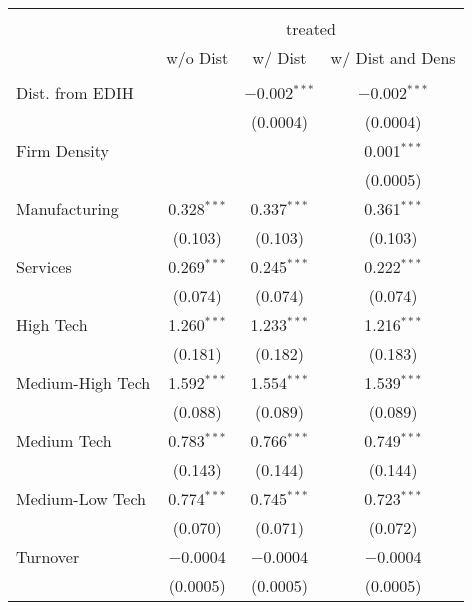 
\begin{table}[!htbp] \centering
\tiny
\renewcommand{\arraystretch}{1} 
  \label{} 
\begin{tabular}{@{\extracolsep{5pt}}lccc} 
\\[-1.8ex]\hline 
\hline 
\\[-1.8ex] & \multicolumn{3}{c}{treated} \\ 
 & w/o Dist & w/ Dist & w/ Dist and Dens \\ 
\hline \\[-1.8ex] 
 Dist. from EDIH &  & $-$0.002$^{***}$ & $-$0.002$^{***}$ \\ 
  &  & (0.0004) & (0.0004) \\ 
  
 Firm Density &  &  & 0.001$^{***}$ \\ 
  &  &  & (0.0005) \\ 
   
 Manufacturing & 0.328$^{***}$ & 0.337$^{***}$ & 0.361$^{***}$ \\ 
  & (0.103) & (0.103) & (0.103) \\ 
   
 Services & 0.269$^{***}$ & 0.245$^{***}$ & 0.222$^{***}$ \\ 
  & (0.074) & (0.074) & (0.074) \\ 
   
 High Tech & 1.260$^{***}$ & 1.233$^{***}$ & 1.216$^{***}$ \\ 
  & (0.181) & (0.182) & (0.183) \\ 

 Medium-High Tech & 1.592$^{***}$ & 1.554$^{***}$ & 1.539$^{***}$ \\ 
  & (0.088) & (0.089) & (0.089) \\ 
   
 Medium Tech & 0.783$^{***}$ & 0.766$^{***}$ & 0.749$^{***}$ \\ 
  & (0.143) & (0.144) & (0.144) \\ 
 
 Medium-Low Tech & 0.774$^{***}$ & 0.745$^{***}$ & 0.723$^{***}$ \\ 
  & (0.070) & (0.071) & (0.072) \\ 
 
 Turnover & $-$0.0004 & $-$0.0004 & $-$0.0004 \\ 
  & (0.0005) & (0.0005) & (0.0005) \\ 
  

\end{tabular}
\end{table}
